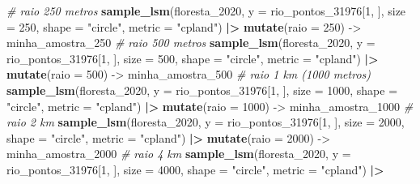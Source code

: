 \documentclass[
]{article}
\newenvironment{Shaded}{\begin{snugshade}}{\end{snugshade}}
\newcommand{\AttributeTok}[1]{\textcolor[rgb]{0.13,0.29,0.53}{#1}}
\newcommand{\CommentTok}[1]{\textcolor[rgb]{0.56,0.35,0.01}{\textit{#1}}}
\newcommand{\DecValTok}[1]{\textcolor[rgb]{0.00,0.00,0.81}{#1}}
\newcommand{\FunctionTok}[1]{\textcolor[rgb]{0.13,0.29,0.53}{\textbf{#1}}}
\newcommand{\NormalTok}[1]{#1}
\newcommand{\OtherTok}[1]{\textcolor[rgb]{0.56,0.35,0.01}{#1}}
\newcommand{\SpecialCharTok}[1]{\textcolor[rgb]{0.81,0.36,0.00}{\textbf{#1}}}
\newcommand{\StringTok}[1]{\textcolor[rgb]{0.31,0.60,0.02}{#1}}
\begin{document}
\begin{Shaded}
\begin{Highlighting}[]
\CommentTok{\# raio 250 metros}
\FunctionTok{sample\_lsm}\NormalTok{(floresta\_2020, }\AttributeTok{y =}\NormalTok{ rio\_pontos\_31976[}\DecValTok{1}\NormalTok{, ], }
           \AttributeTok{size =} \DecValTok{250}\NormalTok{, }\AttributeTok{shape =} \StringTok{"circle"}\NormalTok{, }
           \AttributeTok{metric =} \StringTok{"cpland"}\NormalTok{) }\SpecialCharTok{|\textgreater{}} 
  \FunctionTok{mutate}\NormalTok{(}\AttributeTok{raio =} \DecValTok{250}\NormalTok{) }\OtherTok{{-}\textgreater{}}\NormalTok{ minha\_amostra\_250 }
\CommentTok{\# raio 500 metros}
\FunctionTok{sample\_lsm}\NormalTok{(floresta\_2020, }\AttributeTok{y =}\NormalTok{ rio\_pontos\_31976[}\DecValTok{1}\NormalTok{, ], }
           \AttributeTok{size =} \DecValTok{500}\NormalTok{, }\AttributeTok{shape =} \StringTok{"circle"}\NormalTok{, }
           \AttributeTok{metric =} \StringTok{"cpland"}\NormalTok{)  }\SpecialCharTok{|\textgreater{}} 
  \FunctionTok{mutate}\NormalTok{(}\AttributeTok{raio =} \DecValTok{500}\NormalTok{) }\OtherTok{{-}\textgreater{}}\NormalTok{ minha\_amostra\_500}
\CommentTok{\# raio 1 km (1000 metros)}
\FunctionTok{sample\_lsm}\NormalTok{(floresta\_2020, }\AttributeTok{y =}\NormalTok{ rio\_pontos\_31976[}\DecValTok{1}\NormalTok{, ], }
           \AttributeTok{size =} \DecValTok{1000}\NormalTok{, }\AttributeTok{shape =} \StringTok{"circle"}\NormalTok{, }
           \AttributeTok{metric =} \StringTok{"cpland"}\NormalTok{)  }\SpecialCharTok{|\textgreater{}} 
  \FunctionTok{mutate}\NormalTok{(}\AttributeTok{raio =} \DecValTok{1000}\NormalTok{) }\OtherTok{{-}\textgreater{}}\NormalTok{ minha\_amostra\_1000}
\CommentTok{\# raio 2 km}
\FunctionTok{sample\_lsm}\NormalTok{(floresta\_2020, }\AttributeTok{y =}\NormalTok{ rio\_pontos\_31976[}\DecValTok{1}\NormalTok{, ], }
           \AttributeTok{size =} \DecValTok{2000}\NormalTok{, }\AttributeTok{shape =} \StringTok{"circle"}\NormalTok{, }
           \AttributeTok{metric =} \StringTok{"cpland"}\NormalTok{) }\SpecialCharTok{|\textgreater{}} 
  \FunctionTok{mutate}\NormalTok{(}\AttributeTok{raio =} \DecValTok{2000}\NormalTok{) }\OtherTok{{-}\textgreater{}}\NormalTok{ minha\_amostra\_2000}
\CommentTok{\# raio 4 km}
\FunctionTok{sample\_lsm}\NormalTok{(floresta\_2020, }\AttributeTok{y =}\NormalTok{ rio\_pontos\_31976[}\DecValTok{1}\NormalTok{, ], }
           \AttributeTok{size =} \DecValTok{4000}\NormalTok{, }\AttributeTok{shape =} \StringTok{"circle"}\NormalTok{, }
           \AttributeTok{metric =} \StringTok{"cpland"}\NormalTok{)  }\SpecialCharTok{|\textgreater{}} 

\end{Highlighting}
\end{Shaded}
\end{document}
